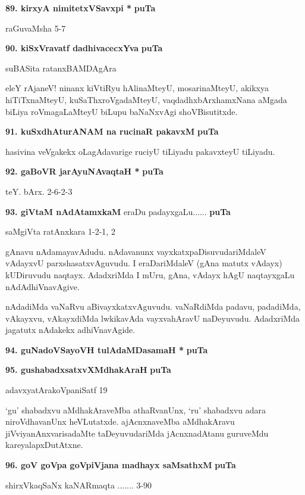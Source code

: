 \eject
\noindent
\textbf{89. kirxyA nimitetxVSavxpi *} \hfill{\bf puTa }

\hfill{raGuvaMsha 5-7}

\medskip
\noindent
\textbf{90. kiSxVravatf dadhivacecxYva} \hfill{\bf puTa }

\hfill{suBASita ratanxBAMDAgAra}

\smallskip
eleY rAjaneV! ninanx kiVtiRyu hAlinaMteyU, mosarinaMteyU, akikxya hiTiTxnaMteyU, kuSaThxroVgadaMteyU, vaqdadhxbArxhamxNana aMgada biLiya roVmagaLaMteyU biLupu baNaNxvAgi shoVBisutitxde.

\medskip
\noindent
\textbf{91. kuSxdhAturANAM na rucinaR pakavxM} \hfill{\bf puTa }

\smallskip
hasivina veVgakekx oLagAdavarige ruciyU tiLiyadu pakavxteyU tiLiyadu.

\medskip
\noindent
\textbf{92. gaBoVR jarAyuNAvaqtaH *} \hfill{\bf puTa }

\hfill{teY. bArx. 2-6-2-3}

\medskip
\noindent
\textbf{93. giVtaM nAdAtamxkaM }eraDu padayxgaLu...... \hfill{\bf puTa }

\hfill{saMgiVta ratAnxkara 1-2-1, 2}

\smallskip
gAnavu nAdamayavAdudu. nAdavanunx vayxkatxpaDisuvudariMdaleV vAdayxvU parxshasatxvAguvudu. I eraDariMdaleV (gAna matutx vAdayx) kUDiruvudu naqtayx. AdadxriMda I mUru, gAna, vAdayx hAgU naqtayxgaLu nAdAdhiVnavAgive.

nAdadiMda vaNaRvu aBivayxkatxvAguvudu. vaNaRdiMda padavu, padadiMda, vAkayxvu, vAkayxdiMda lwkikavAda vayxvahAravU naDeyuvudu. AdadxriMda jagatutx nAdakekx adhiVnavAgide.


\medskip
\noindent
\textbf{94. guNadoVSayoVH tulAdaMDasamaH *} \hfill{\bf puTa }

\medskip
\noindent
\textbf{95. gushabadxsatxvXMdhakAraH} \hfill{\bf puTa }

\hfill{adavxyatArakoVpaniSatf 19}

\smallskip
`gu' shabadxvu aMdhakAraveMba athaRvanUnx, `ru' shabadxvu adara niroVdhavanUnx heVLutatxde. ajAcnxnaveMba aMdhakAravu jiVviyanAnxvarisadaMte taDeyuvudariMda jAcnxnadAtanu guruveMdu kareyalapxDutAtxne.

\medskip
\noindent
\textbf{96. goV goVpa goVpiVjana madhayx saMsathxM} \hfill{\bf puTa }

\hfill{shirxVkaqSaNx kaNARmaqta ....... 3-90}

